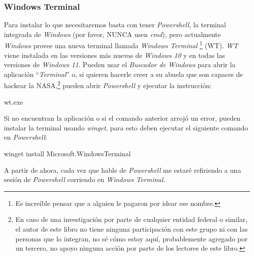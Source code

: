 \subsubsection{Windows Terminal}
  Para instalar lo que necesitaremos basta con tener \textit{Powershell}, la terminal integrada de
  \textit{Windows} (por favor, NUNCA usen \textit{cmd}), pero actualmente \textit{Windows} provee
  una nueva terminal llamada \textit{Windows Terminal}
  \autocite{cinnamon-msftOverviewWindowsTerminal}\footnote{Es increíble pensar que a alguien
  le pagaron por idear ese nombre.} (WT).
  \textit{WT} viene instalada en las 
  versiones más nuevas de \textit{Windows 10} y en todas las versiones de \textit{Windows 11}.
  Pueden usar el \textit{Buscador de Windows} para abrir la aplicación \enquote{\textit{Terminal}}
  o, si quieren hacerle creer a su abuela que son capaces de hackear la NASA,\footnote{En caso de 
  una investigación por parte de cualquier entidad federal o similar, el autor de este libro no 
  tiene ninguna participación con este grupo ni con las personas que lo integran, no sé cómo 
  estoy aquí, probablemente agregado por un tercero, no apoyo ninguna acción por parte de los 
  lectores de este libro.} pueden abrir \textit{Powershell} y ejecutar la instrucción:
  \begin{powershell}
    wt.exe
  \end{powershell}

  Si no encuentran la aplicación o si el comando anterior arrojó un error, pueden instalar la 
  terminal usando \textit{winget}, para esto deben ejecutar el siguiente comando en 
  \textit{Powershell}:
  \begin{powershell}
    winget install Microsoft.WindowsTerminal
  \end{powershell}

  A partir de ahora, cada vez que hable de \textit{Powershell} me estaré refiriendo a una sesión
  de \textit{Powershell} corriendo en \textit{Windows Terminal}.

